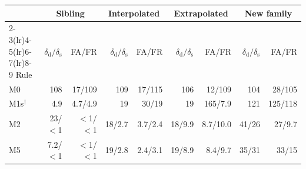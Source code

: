 \documentclass[pdflatex,sn-basic,lineno]{sn-jnl}
\providecommand{\DIFaddbeginFL}{} %
\providecommand{\DIFdelendFL}{} %
\newcommand{\DIFaddincludegraphics}[2][]{{\color{blue}\fbox{\DIFOincludegraphics[#1]{#2}}}} %
\DeclareRobustCommand{\DIFaddbeginFL}{\DIFOaddbeginFL \let\includegraphics\DIFaddincludegraphics} %
\DeclareRobustCommand{\DIFdelendFL}{\DIFOaddendFL \let\includegraphics\DIFOincludegraphics} %
\begin{document}
\begin{table}[t]
\DIFdelendFL \DIFaddbeginFL \begin{tabular}{@{}lrrrrrrrr@{}}
\toprule
 & \multicolumn{2}{c}{Sibling} & \multicolumn{2}{c}{Interpolated} & \multicolumn{2}{c}{Extrapolated} & \multicolumn{2}{c}{New family} \\
\cmidrule(lr){2-3}\cmidrule(lr){4-5}\cmidrule(lr){6-7}\cmidrule(lr){8-9}
Rule & $\delta_\mathrm{d}/\delta_\mathrm{s}$ & FA/FR & $\delta_\mathrm{d}/\delta_\mathrm{s}$ & FA/FR & $\delta_\mathrm{d}/\delta_\mathrm{s}$ & FA/FR & $\delta_\mathrm{d}/\delta_\mathrm{s}$ & FA/FR \\
\midrule
M0 & 108 & 17/109 & 109 & 17/115 & 106 & 12/109 & 104 & 28/105 \\
M1s$^\dagger$ & 4.9 & 4.7/4.9 & 19 & 30/19 & 19 & 165/7.9 & 121 & 125/118 \\
M2 & 23/$<$1 & $<$1/$<$1 & 18/2.7 & 3.7/2.4 & 18/9.9 & 8.7/10.0 & 41/26 & 27/9.7 \\
M5 & 7.2/$<$1 & $<$1/$<$1 & 19/2.8 & 2.4/3.1 & 19/8.9 & 8.4/9.7 & 35/31 & 33/15 \\

\end{tabular}
\end{table}
\end{document}
